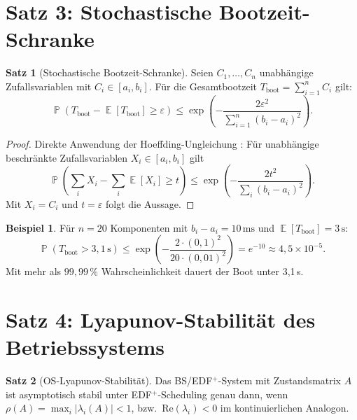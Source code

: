 ﻿\documentclass[a4paper,12pt]{scrreprt}
\theoremstyle{definition}
\newtheorem{satz}{Satz}[chapter]
\newtheorem{beispiel}{Beispiel}[chapter]
\DeclareMathOperator{\E}{\mathbb{E}}
\DeclareMathOperator{\Prob}{\mathbb{P}}
\begin{document}
	\section{Satz 3: Stochastische Bootzeit-Schranke}
	
	\begin{satz}[Stochastische Bootzeit-Schranke]\label{satz:boottime}
		Seien $C_1, \ldots, C_n$ unabhängige Zufallsvariablen mit
		$C_i \in [a_i, b_i]$. Für die Gesamtbootzeit
		$T_{\mathrm{boot}} = \sum_{i=1}^n C_i$ gilt:
		\[
		\Prob\!\left(T_{\mathrm{boot}} - \E[T_{\mathrm{boot}}] \geq \varepsilon\right)
		\leq \exp\!\left(-\frac{2\varepsilon^2}{\sum_{i=1}^n (b_i - a_i)^2}\right).
		\]
	\end{satz}
	
	\begin{proof}
		Direkte Anwendung der Hoeffding-Ungleichung \cite{Hoeffding1963}:
		Für unabhängige beschränkte Zufallsvariablen $X_i \in [a_i, b_i]$ gilt
		\[
		\Prob\!\left(\sum_i X_i - \sum_i \E[X_i] \geq t\right)
		\leq \exp\!\left(-\frac{2t^2}{\sum_i (b_i-a_i)^2}\right).
		\]
		Mit $X_i = C_i$ und $t = \varepsilon$ folgt die Aussage.
	\end{proof}
	
	\begin{beispiel}
		Für $n = 20$ Komponenten mit $b_i - a_i = 10\,\text{ms}$ und
		$\E[T_{\mathrm{boot}}] = 3\,\text{s}$:
		\[
		\Prob(T_{\mathrm{boot}} > 3{,}1\,\text{s})
		\leq \exp\!\left(-\frac{2 \cdot (0{,}1)^2}{20 \cdot (0{,}01)^2}\right)
		= e^{-10} \approx 4{,}5 \times 10^{-5}.
		\]
		Mit mehr als $99{,}99\,\%$ Wahrscheinlichkeit dauert der Boot unter 3,1\,s.
	\end{beispiel}
	
	\section{Satz 4: Lyapunov-Stabilität des Betriebssystems}
	
	\begin{satz}[OS-Lyapunov-Stabilität]\label{satz:os_lyapunov}
		Das BS/EDF$^+$-System mit Zustandsmatrix $A$ ist asymptotisch
		stabil unter EDF$^+$-Scheduling genau dann, wenn
		$\rho(A) = \max_i |\lambda_i(A)| < 1$,
		bzw.\ $\mathrm{Re}(\lambda_i) < 0$ im kontinuierlichen Analogon.
	\end{satz}
	
\end{document}
